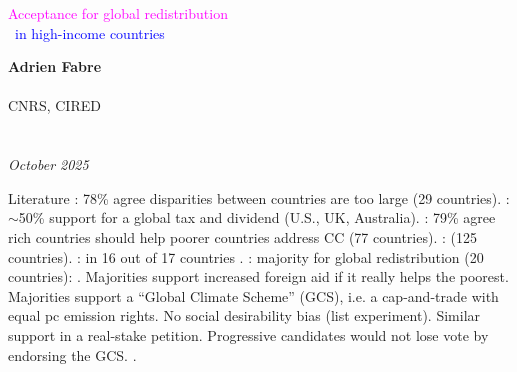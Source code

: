 \documentclass[aspectratio=169,xcolor=dvipsnames, 11pt,mathserif]{beamer}
\begin{document}

\begin{frame}
\thispagestyle{empty}
\begin{center}
\begin{LARGE}
\textcolor{magenta}{Acceptance for global redistribution}\\~\textcolor{blue}{in high-income countries} \end{LARGE}
\vspace{1cm}

\textbf{Adrien Fabre} \\ \quad \\
CNRS, CIRED \\ \quad \\ \quad \\
\textit{October 2025} 
\end{center}
\bigskip
\end{frame}


\begin{frame}{Literature\label{literature}}
\bbvsp
\ip {}: 78\% agree disparities between countries are too large (29 countries).
\ip {}: $\sim$50\% support for a global tax and dividend (U.S., UK, Australia).
\ip {}: 79\% agree rich countries should help poorer countries address CC (77 countries).
\ip {}:  (125 countries).
\ip {}:  in 16 out of 17 countries .
\ip {}:  majority  for global redistribution (20 countries):
\bbvsp \ip {}.
\ip Majorities support increased foreign aid if it really helps the poorest.
\ip Majorities support a ``Global Climate Scheme'' (GCS), i.e. a cap-and-trade with equal pc emission rights.
\ip No social desirability bias (list experiment). Similar support in a real-stake petition.
\ip Progressive candidates would not lose vote by endorsing the GCS.
\ip {}.
\ee \ee
\end{frame}
\end{document}
